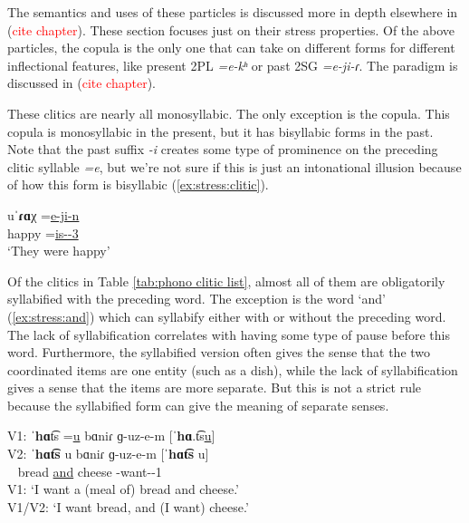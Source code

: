 The semantics and uses of  these particles is discussed more in depth elsewhere in (\textcolor{red}{cite chapter}). These section focuses just on their stress properties. Of the above particles, the copula is the only one that can take on different forms for different inflectional features, like present 2PL \textit{=e-kʰ} or past 2SG \textit{=e-ji-ɾ}. The paradigm is discussed in (\textcolor{red}{cite chapter}). 


These clitics are nearly all monosyllabic. The only exception is the copula. This copula is monosyllabic in the present, but it has bisyllabic forms in the past. Note that the past suffix \textit{-i} creates some type of prominence on the preceding  clitic syllable \textit{=e}, but we're not sure if this is just an intonational illusion because of how this form is bisyllabic  (\ref{ex:stress:clitic}). 

\begin{exe}
	\ex \gll uˈ\textbf{ɾɑ}χ =\underline{e-ji-n}
	\\
	happy =\underline{is-{\pst}-3{\pl}}
	\\
	\trans `They were happy' \label{ex:stress:clitic}
	\\
\end{exe}

Of the clitics in Table \ref{tab:phono clitic list}, almost all of them are obligatorily syllabified with the preceding word. The exception is the word `and' (\ref{ex:stress:and}) which can syllabify either with or without the preceding word. The lack of syllabification   correlates with having some type of pause before this word. Furthermore, the syllabified version often gives the sense that the two coordinated items are one entity (such as a dish), while the lack of syllabification gives a sense that the items are more separate. But this is not a strict rule because the syllabified form can give the meaning of separate senses. 

\begin{exe}
	\ex \glll V1: ˈ\textbf{hɑ}t͡s =\underline{u} bɑniɾ ɡ-uz-e-m [ˈ\textbf{hɑ}.t͡s\underline{u}]
	\\
	V2: ˈ\textbf{hɑt͡s} u bɑniɾ ɡ-uz-e-m [ˈ\textbf{hɑt͡s} u]
	\\
	~ bread  \underline{and} cheese {\ind}-want-{\thgloss}-1{\sg}
	\\
	\trans V1: `I want a (meal of) bread and cheese.'
	\label{ex:stress:and}
	\\
	V1/V2: `I want bread, and (I want) cheese.'
	\\
\end{exe}


